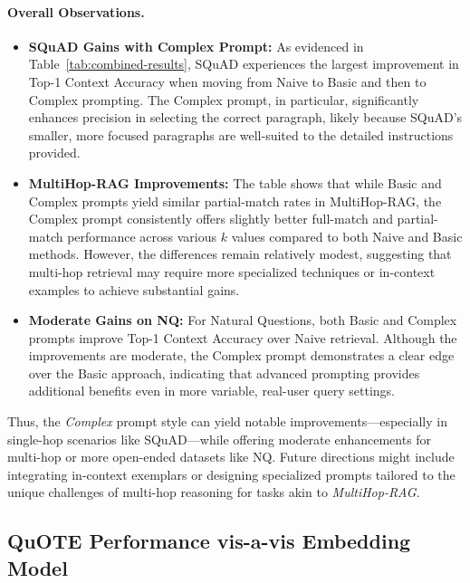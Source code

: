 \vspace{1em}
\paragraph{Overall Observations.}
\begin{itemize}
    \item \textbf{SQuAD Gains with Complex Prompt:} As evidenced in Table~\ref{tab:combined-results}, SQuAD experiences the largest improvement in Top-1 Context Accuracy when moving from Naive to Basic and then to Complex prompting. The Complex prompt, in particular, significantly enhances precision in selecting the correct paragraph, likely because SQuAD’s smaller, more focused paragraphs are well-suited to the detailed instructions provided.
    
    \item \textbf{MultiHop-RAG Improvements:} The table shows that while Basic and Complex prompts yield similar partial-match rates in MultiHop-RAG, the Complex prompt consistently offers slightly better full-match and partial-match performance across various \(k\) values compared to both Naive and Basic methods. However, the differences remain relatively modest, suggesting that multi-hop retrieval may require more specialized techniques or in-context examples to achieve substantial gains.
    
    \item \textbf{Moderate Gains on NQ:} For Natural Questions, both Basic and Complex prompts improve Top-1 Context Accuracy over Naive retrieval. Although the improvements are moderate, the Complex prompt demonstrates a clear edge over the Basic approach, indicating that advanced prompting provides additional benefits even in more variable, real-user query settings.
\end{itemize}

Thus, the \emph{Complex} prompt style can yield notable improvements—especially in single-hop scenarios like SQuAD—while offering moderate enhancements for multi-hop or more open-ended datasets like NQ. Future directions might include integrating in-context exemplars or designing specialized prompts tailored to the unique challenges of multi-hop reasoning for tasks akin to \emph{MultiHop-RAG}.
\fi


\subsection{QuOTE Performance vis-a-vis Embedding Model}
\label{sec:quote-orthogonality}

